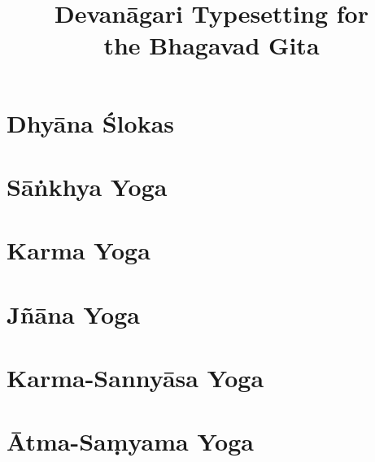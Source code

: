 \documentclass{scrbook}
\title{Devanāgari Typesetting for \\ the Bhagavad Gita}
\author{}
\begin{document}
\maketitle
\frontmatter

\tableofcontents
\newpage

\chapter{Dhyāna Ślokas}


\mainmatter
\setcounter{chapter}{1}

\chapter{Sāṅkhya Yoga}
\begin{multicols}{2}
    
\end{multicols}

\chapter{Karma Yoga}
\begin{multicols}{2}
    
\end{multicols}

\chapter{Jñāna Yoga}
\begin{multicols}{2}
    
\end{multicols}

\chapter{Karma-Sannyāsa Yoga}
\begin{multicols}{2}
    
\end{multicols}

\chapter{Ātma-Saṃyama Yoga}
\begin{multicols}{2}
    
\end{multicols}
\end{document}

